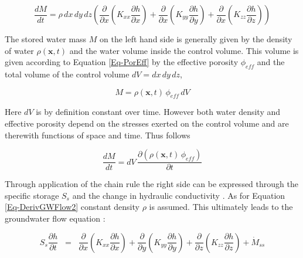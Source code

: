 \begin{equation}
    \label{Eq-DerivGWFlow4}
    \frac{dM}{dt} = \rho \, dx \, dy \, dz \left( \frac{\partial}{\partial x} \left( K_{xx} \frac{\partial h}{\partial x} \right) + \frac{\partial}{\partial x} \left( K_{yy} \frac{\partial h}{\partial y} \right) + \frac{\partial}{\partial x} \left( K_{zz} \frac{\partial h}{\partial z} \right) \right)
\end{equation}

The stored water mass $M$ on the left hand side is generally given by the density of water $\rho(\bm{x},t)$ and the water volume inside the control volume. This volume is given according to Equation \eqref{Eq-PorEff} by the effective porosity $\phi_{eff}$ and the total volume of the control volume $dV = dx \, dy \, dz$,

\begin{equation}
    \label{Eq-DerivGWFlow5}
    M = \rho(\bm{x},t) \, \phi_{eff} \, dV
\end{equation}

\noindent Here $dV$ is by definition constant over time. However both water density and effective porosity depend on the stresses exerted on the control volume and are therewith functions of space and time. Thus follows

\begin{equation}
    \label{Eq-DerivGWFlow6}
    \frac{dM}{dt} = dV \, \frac{\partial (\rho(\bm{x},t) \, \phi_{eff})}{\partial t}
\end{equation}

\noindent Through application of the chain rule the right side can be expressed through the specific storage $S_s$ and the change in hydraulic conductivity \parencite{Mays.2005}. As for Equation \eqref{Eq-DerivGWFlow2} constant density $\rho$ is assumed. This ultimately leads to the groundwater flow equation \parencite{Mays.2005}:

\begin{equation}
    \label{Eq-GWFlow}
    S_s \frac{\partial h}{\partial t} \; \; = \; \; \frac{\partial}{\partial x} \left(K_{xx} \frac{\partial h}{\partial x} \right) + \frac{\partial}{\partial y} \left(K_{yy} \frac{\partial h}{\partial y} \right) + \frac{\partial}{\partial z} \left(K_{zz} \frac{\partial h}{\partial z} \right) + \dot{M}_{ss}
\end{equation}